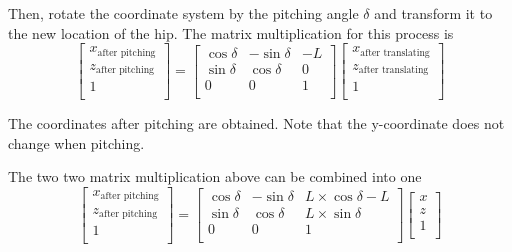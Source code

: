 Then, rotate the coordinate system by the pitching angle $\delta$ and transform it to the new location of the hip. The matrix multiplication for this process is
\begin{equation}
   \begin{bmatrix}
   x_\text{after pitching} \\
   z_\text{after pitching} \\
   1                       \\
   \end{bmatrix}
   =
   \begin{bmatrix}
   \cos\delta & -\sin\delta & -L \\
   \sin\delta & \cos\delta & 0 \\
   0 & 0 & 1 \\
   \end{bmatrix}
   \begin{bmatrix}
   x_\text{after translating} \\
   z_\text{after translating} \\
   1                          \\
   \end{bmatrix}
\end{equation}

The coordinates after pitching are obtained. Note that the y-coordinate does not change when pitching.

The two two matrix multiplication above can be combined into one
\begin{equation}\label{eq:pitching_fr_leg}
   \begin{bmatrix}
   x_\text{after pitching} \\
   z_\text{after pitching} \\
   1                       \\
   \end{bmatrix}
   =
   \begin{bmatrix}
   \cos\delta & -\sin\delta & L \times \cos\delta - L \\
   \sin\delta & \cos\delta & L \times \sin\delta \\
   0 & 0 & 1 \\
   \end{bmatrix}
   \begin{bmatrix}
   x \\
   z \\
   1 \\
   \end{bmatrix}
\end{equation}


